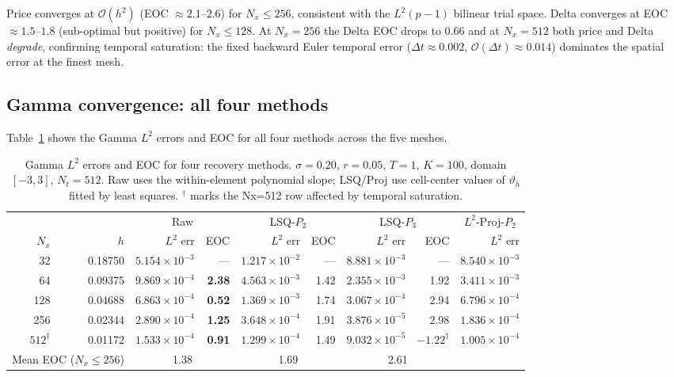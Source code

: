 \documentclass[11pt,a4paper]{article}
\newcommand{\Nx}{N_x}
\newcommand{\bigo}[1]{\mathcal{O}(#1)}
\newcommand{\vth}{\vartheta}
\begin{document}
Price converges at $\bigo{h^2}$ (EOC $\approx 2.1$--$2.6$) for
$\Nx \le 256$, consistent with the $L^2(p{-}1)$ bilinear trial space.
Delta converges at EOC $\approx 1.5$--$1.8$ (sub-optimal but positive)
for $\Nx \le 128$.  At $\Nx = 256$ the Delta EOC drops to $0.66$
and at $\Nx = 512$ both price and Delta \emph{degrade}, confirming
temporal saturation: the fixed backward Euler temporal error
($\Delta t \approx 0.002$, $\bigo{\Delta t} \approx 0.014$)
dominates the spatial error at the finest mesh.

\subsection{Gamma convergence: all four methods}
\label{sec:gamma-results}

Table~\ref{tab:gamma} shows the Gamma $L^2$ errors and EOC for all four
methods across the five meshes.

\begin{table}[htbp]
\centering
\caption{Gamma $L^2$ errors and EOC for four recovery methods.
         $\sigma=0.20$, $r=0.05$, $T=1$, $K=100$, domain $[-3,3]$, $N_t=512$.
         Raw uses the within-element polynomial slope; LSQ/Proj use cell-center
         values of $\vth_h$ fitted by least squares.
         ${}^\dagger$ marks the Nx=512 row affected by temporal saturation.}
\label{tab:gamma}
\small
\begin{tabular}{rrrrrrrrr}
\toprule
 & & \multicolumn{2}{c}{Raw} & \multicolumn{2}{c}{LSQ-$P_2$} & \multicolumn{2}{c}{LSQ-$P_3$} & \multicolumn{1}{c}{$L^2$-Proj-$P_2$} \\
\cmidrule(lr){3-4}\cmidrule(lr){5-6}\cmidrule(lr){7-8}\cmidrule(lr){9-9}
$\Nx$ & $h$ & $L^2$ err & EOC & $L^2$ err & EOC & $L^2$ err & EOC & $L^2$ err \\
\midrule
  32 & 0.18750 & $5.154\times10^{-3}$ & --- & $1.217\times10^{-2}$ & --- & $8.881\times10^{-3}$ & --- & $8.540\times10^{-3}$ \\
  64 & 0.09375 & $9.869\times10^{-4}$ & \textbf{2.38} & $4.563\times10^{-3}$ & 1.42 & $2.355\times10^{-3}$ & 1.92 & $3.411\times10^{-3}$ \\
 128 & 0.04688 & $6.863\times10^{-4}$ & \textbf{0.52} & $1.369\times10^{-3}$ & 1.74 & $3.067\times10^{-4}$ & 2.94 & $6.796\times10^{-4}$ \\
 256 & 0.02344 & $2.890\times10^{-4}$ & \textbf{1.25} & $3.648\times10^{-4}$ & 1.91 & $3.876\times10^{-5}$ & 2.98 & $1.836\times10^{-4}$ \\
$512^\dagger$ & 0.01172 & $1.533\times10^{-4}$ & \textbf{0.91} & $1.299\times10^{-4}$ & 1.49 & $9.032\times10^{-5}$ & $-1.22^\dagger$ & $1.005\times10^{-4}$ \\
\midrule
\multicolumn{2}{l}{Mean EOC ($\Nx\le256$)} & \multicolumn{2}{c}{1.38} & \multicolumn{2}{c}{1.69} & \multicolumn{2}{c}{2.61} & \\
\bottomrule
\end{tabular}
\end{table}
\end{document}
